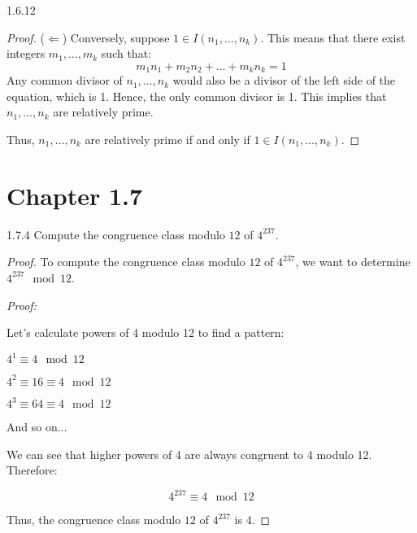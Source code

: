 \documentclass[12pt]{amsart}
\theoremstyle{definition}
\numberwithin{equation}{section}
\theoremstyle{plain}
\begin{document}
\begin{exercise}{1.6.12}
\begin{proof}
($\Leftarrow$) Conversely, suppose \( 1 \in I(n_1, \dots, n_k) \). This means that there exist integers \( m_1, \dots, m_k \) such that:
\[ m_1n_1 + m_2n_2 + \dots + m_kn_k = 1 \]
Any common divisor of \( n_1, \dots, n_k \) would also be a divisor of the left side of the equation, which is 1. Hence, the only common divisor is 1. This implies that \( n_1, \dots, n_k \) are relatively prime.

Thus, \( n_1, \dots, n_k \) are relatively prime if and only if \( 1 \in I(n_1, \dots, n_k) \).

    \end{proof}
\end{exercise}
\section*{Chapter 1.7}
\begin{exercise}{1.7.4}
    Compute the congruence class modulo $12$ of $4^{237}$.
\begin{proof}
    To compute the congruence class modulo \(12\) of \(4^{237}\), we want to determine \(4^{237} \mod 12\).
    
    \textit{Proof:}
    
    Let's calculate powers of 4 modulo 12 to find a pattern:
    
    \(4^1 \equiv 4 \mod 12\)
    
    \(4^2 \equiv 16 \equiv 4 \mod 12\)
    
    \(4^3 \equiv 64 \equiv 4 \mod 12\)
    
    And so on...
    
    We can see that higher powers of 4 are always congruent to 4 modulo 12. Therefore:
    
    \[4^{237} \equiv 4 \mod 12\]
    
    Thus, the congruence class modulo \(12\) of \(4^{237}\) is \(4\).
\end{proof}
\end{exercise}
\end{document}

